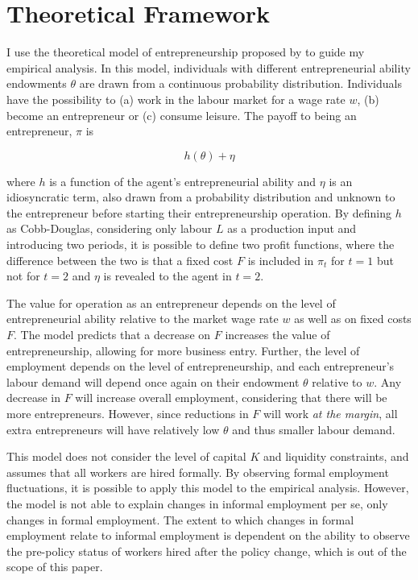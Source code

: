 \documentclass[11pt,a4paper]{article}\usepackage[]{graphicx}\usepackage[]{xcolor}
\begin{document}
\section{Theoretical Framework}

I use the theoretical model of entrepreneurship proposed by \textcite{Branstetter.2014} to guide my empirical analysis. In this model, individuals with different entrepreneurial ability endowments $\theta$ are drawn from a continuous probability distribution. Individuals have the possibility to (a) work in the labour market for a wage rate $w$, (b) become an entrepreneur or (c) consume leisure. The payoff to being an entrepreneur, $\pi$ is

\begin{equation}
  h(\theta) + \eta
\end{equation}

where $h$ is a function of the agent's entrepreneurial ability and $\eta$ is an idiosyncratic term, also drawn from a probability distribution and unknown to the entrepreneur before starting their entrepreneurship operation. By defining $h$ as Cobb-Douglas, considering only labour $L$ as a production input and introducing two periods, it is possible to define two profit functions, where the difference between the two is that a fixed cost $F$ is included in $\pi_t$ for $t = 1$ but not for $t=2$ and $\eta$ is revealed to the agent in $t=2$. 

The value for operation as an entrepreneur depends on the level of entrepreneurial ability relative to the market wage rate $w$ as well as on fixed costs $F$. The model predicts that a decrease on $F$ increases the value of entrepreneurship, allowing for more business entry. Further, the level of employment depends on the level of entrepreneurship, and each entrepreneur's labour demand will depend once again on their endowment $\theta$ relative to $w$. Any decrease in $F$ will increase overall employment, considering that there will be more entrepreneurs. However, since reductions in $F$ will work \textit{at the margin}, all extra entrepreneurs will have relatively low $\theta$ and thus smaller labour demand.

This model does not consider the level of capital $K$ and liquidity constraints, and assumes that all workers are hired formally. By observing formal employment fluctuations, it is possible to apply this model to the empirical analysis. However, the model is not able to explain changes in informal employment per se, only changes in formal employment. The extent to which changes in formal employment relate to informal employment is dependent on the ability to observe the pre-policy status of workers hired after the policy change, which is out of the scope of this paper.
\end{document}
